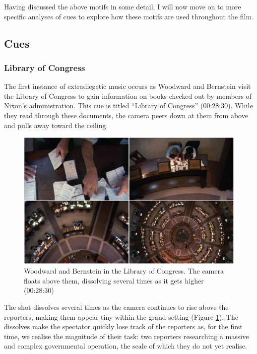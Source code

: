 Having discussed the above motifs in some detail, I will now move on to more specific analyses of cues to explore how these motifs are used throughout the film.

\subsection{Cues}

\subsubsection{Library of Congress}

The first instance of extradiegetic music occurs as Woodward and Bernstein visit the Library of Congress to gain information on books checked out by members of Nixon’s administration.
This cue is titled ``Library of Congress” (00:28:30).\autocite[I have taken the names of these cues from the soundtrack album released in 2007. Although the scores heard on this release are not exactly as they appear in the film, for ease of reference I will continue to refer to them as they relate to the soundtrack album.][]{film_score_monthly_film_nodate}
While they read through these documents, the camera peers down at them from above and pulls away toward the ceiling.
\begin{figure}
    \centering
    \includegraphics[width=1\linewidth]{img/president-library-dissolve.pdf}
    \caption{Woodward and Bernstein in the Library of Congress. The camera floats above them, dissolving several times as it gets higher (00:28:30)}
    \label{fig:president-library-dissolve}
\end{figure}
The shot dissolves several times as the camera continues to rise above the reporters, making them appear tiny within the grand setting (Figure \ref{fig:president-library-dissolve}).
The dissolves make the spectator quickly lose track of the reporters as, for the first time, we realise the magnitude of their task: two reporters researching a massive and complex governmental operation, the scale of which they do not yet realise.


